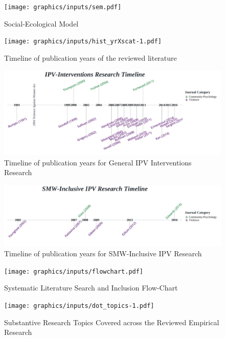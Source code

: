 \documentclass[11pt,]{tufte-book}
\begin{document}
\begin{figure}
\centering
\texttt{[image: graphics/inputs/sem.pdf]}
\caption{Social-Ecological Model\label{fig:sem}}
\end{figure}

\newpage

\begin{figure}
\centering
\texttt{[image: graphics/inputs/hist\_yrXscat-1.pdf]}
\caption{Timeline of publication years of the reviewed
literature\label{fig:yrhist}}
\end{figure}

\begin{figure}
\centering
\includegraphics{graphics/inputs/tl_inv-1.png}
\caption{Timeline of publication years for General IPV Interventions
Research\label{fig:tl_inv}}
\end{figure}

\begin{figure}
\centering
\includegraphics{graphics/inputs/tl_smw-1.png}
\caption{Timeline of publication years for SMW-Inclusive IPV
Research\label{fig:tl_smw}}
\end{figure}

\newpage

\begin{figure}
\centering
\texttt{[image: graphics/inputs/flowchart.pdf]}
\caption{Systematic Literature Search and Inclusion
Flow-Chart\label{fig:flowchart}}
\end{figure}

\newpage

\begin{figure}
\centering
\texttt{[image: graphics/inputs/dot\_topics-1.pdf]}
\caption{Substantive Research Topics Covered across the Reviewed
Empirical Research\label{fig:topics}}
\end{figure}
\end{document}

